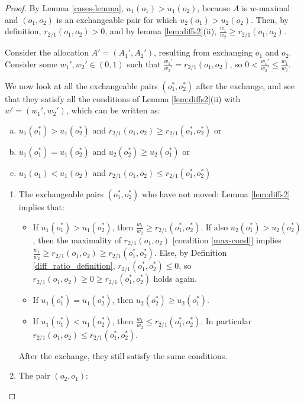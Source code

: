 \documentclass[sigconf]{aamas}
\theoremstyle{definition}
\begin{document}
\begin{proof}
By Lemma \ref{cases-lemma}, $u_1(o_1) > u_1(o_2)$, because $A$ is $w$-maximal and $(o_1,o_2)$ is an exchangeable pair for which $u_2(o_1)>u_2(o_2)$.
Then, by definition, $r_{2/1}(o_1,o_2) > 0$, and by lemma \ref{lem:diffs2}(ii), $\frac{w_1}{w_2} \geq r_{2/1}(o_1,o_2)$.

Consider the allocation $A'=(A_1',A_2')$, resulting from exchanging $o_1$ and $o_2$. Consider some $w_1',w_2'\in (0,1)$ such that $\frac{w_1'}{w_2'} = r_{2/1}(o_1,o_2)$, so $0 < \frac{w_1'}{w_2'} \leq \frac{w_1}{w_2}$.

We now look at all the exchangeable pairs $(o_1^*,o_2^*)$ after the exchange, and see that they satisfy all the conditions of Lemma \ref{lem:diffs2}(ii) with $w'=(w_1',w_2')$, which can be written as:
\begin{enumerate}[(a)] %
\item $u_1(o_1^*) > u_1(o_2^*)$ and 
    $r_{2/1}(o_1,o_2) \geq r_{2/1}(o_1^*,o_2^*)$ or
\item $u_1(o_1^*) = u_1(o_2^*)$ and
    $u_2(o_2^*)\geq u_2(o_1^*)$ or
\item $u_1(o_1) < u_1(o_2)$ and
    $r_{2/1}(o_1,o_2) \leq r_{2/1}(o_1^*,o_2^*)$
\end{enumerate}

\begin{enumerate}
    \item The exchangeable pairs $(o_1^*,o_2^*)$ who have not moved: 
Lemma \ref{lem:diffs2} implies that:
\begin{itemize}
\item If $u_1(o_1^*) > u_1(o_2^*)$, then $\frac{w_1}{w_2} \geq r_{2/1}(o_1^*,o_2^*)$. If also $u_2(o_1^*) > u_2(o_2^*)$, then the maximality of $r_{2/1}(o_1,o_2)$ [condition \ref{max-cond}] implies $\frac{w_1}{w_2} \geq r_{2/1}(o_1,o_2) \geq r_{2/1}(o_1^*,o_2^*)$. 
Else, by Definition \ref{diff_ratio_definition}, $r_{2/1}(o_1^*,o_2^*) \leq 0$, so $r_{2/1}(o_1,o_2) \geq 0 \geq r_{2/1}(o_1^*,o_2^*)$ holds again.
\item If $u_1(o_1^*) = u_1(o_2^*)$, then $u_2(o_2^*) \geq u_2(o_1^*)$.
\item If $u_1(o_1^*) < u_1(o_2^*)$, then $\frac{w_1}{w_2} \leq r_{2/1}(o_1^*,o_2^*)$. In particular $r_{2/1}(o_1,o_2) \leq r_{2/1}(o_1^*,o_2^*)$.
\end{itemize} 
After the exchange, they still satisfy the same conditions.

    \item The pair $(o_2,o_1)$:


\end{enumerate}
\end{proof}
\end{document}
